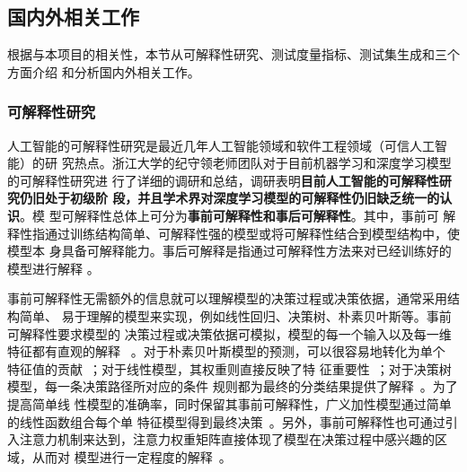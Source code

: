 \subsection{国内外相关工作}\label{relatedwork}


根据与本项目的相关性，本节从可解释性研究、测试度量指标、测试集生成和三个方面介绍
和分析国内外相关工作。

\subsubsection{可解释性研究}
{人工智能的可解释性研究是最近几年人工智能领域和软件工程领域（可信人工智能）的研
究热点}。浙江大学的纪守领老师团队对于目前机器学习和深度学习模型的可解释性研究进
行了详细的调研和总结，调研表明\textbf{目前人工智能的可解释性研究仍旧处于初级阶
段，并且学术界对深度学习模型的可解释性仍旧缺乏统一的认识}。模
型可解释性总体上可分为\textbf{事前可解释性和事后可解释性}。其中，事前可
解释性指通过训练结构简单、可解释性强的模型或将可解释性结合到模型结构中，使模型本
身具备可解释能力。事后可解释是指通过可解释性方法来对已经训练好的模型进行解释
。

事前可解释性无需额外的信息就可以理解模型的决策过程或决策依据，通常采用结构简单、
易于理解的模型来实现，例如线性回归、决策树、朴素贝叶斯等。事前可解释性要求模型的
决策过程或决策依据可模拟，模型的每一个输入以及每一维特征都有直观的解释
~。对于朴素贝叶斯模型的预测，可以很容易地转化为单个
特征值的贡献~；对于线性模型，其权重则直接反映了特
征重要性~；对于决策树模型，每一条决策路径所对应的条件
规则都为最终的分类结果提供了解释~。为了提高简单线
性模型的准确率，同时保留其事前可解释性，广义加性模型通过简单的线性函数组合每个单
特征模型得到最终决策~。另外，事前可解释性也可通过引
入注意力机制来达到，注意力权重矩阵直接体现了模型在决策过程中感兴趣的区域，从而对
模型进行一定程度的解释~。

